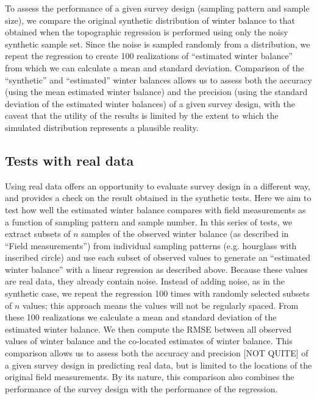 \documentclass{article}
\begin{document}
To assess the performance of a given survey design (sampling pattern and sample size), we compare the original synthetic distribution of winter balance to that obtained when the topographic regression is performed using only the noisy synthetic sample set. 
Since the noise is sampled randomly from a distribution, we repeat the regression to create 100 realizations of ``estimated winter balance'' from which we can calculate a mean and standard deviation. Comparison of the ``synthetic'' and ``estimated'' winter balances allows us to assess both the accuracy (using the mean estimated winter balance) and the precision (using the standard deviation of the estimated winter balances) 
of a given survey design, with the caveat that the utility of the results is limited by the extent to which the simulated distribution represents a plausible reality.   
 
 \subsection{Tests with real data}
 
 Using real data offers an opportunity to evaluate survey design in a different way, and provides a check on the result obtained in the synthetic tests. Here we aim to test how well the estimated winter balance compares with field measurements as a function of sampling pattern and sample number. In this series of tests, we extract subsets of $n$ samples of the observed winter balance (as described in ``Field measurements'') from individual sampling patterns (e.g. hourglass with inscribed circle) and use each subset of observed values to generate an ``estimated winter balance'' with a linear regression as described above. Because these values are real data, they already contain noise. Instead of adding noise, as in the synthetic case, we repeat the regression 100 times with randomly selected subsets of $n$ values; this approach means the values will not be regularly spaced. From these 100 realizations we calculate a mean and standard deviation of the estimated winter balance. We then compute the RMSE between all observed values of winter balance and the co-located estimates of winter balance. This comparison allows us to assess both the accuracy and precision [NOT QUITE] of a given survey design in predicting real data, but is limited to the locations of the original field measurements. By its nature, this comparison also combines the performance of the survey design with the performance of the regression. 
\end{document}
